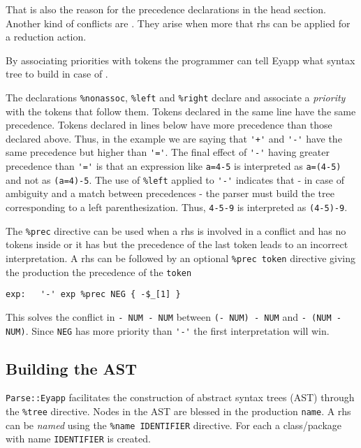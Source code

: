 That is also the reason for the precedence declarations in the 
head section. Another kind of conflicts are .
They arise when more that rhs can be applied for a reduction
action.

By associating priorities with tokens
the programmer can tell Eyapp what syntax tree
to build in case of .

The declarations 
\verb|%nonassoc|, \verb|%left| and \verb|%right| 
declare and associate a {\it priority} with the tokens
that follow them.  
Tokens declared in the same line have the same precedence. 
Tokens declared in lines below have more
precedence than those declared above. Thus, in the example
we are saying that \verb|'+'| and \verb|'-'| have the same precedence
but higher than \verb|'='|. The final effect of \verb|'-'|
having greater precedence than \verb|'='| is that an
expression like \verb|a=4-5| is interpreted as \verb|a=(4-5)| 
and not as \verb|(a=4)-5|.  The use of \verb|%left| applied to \verb|'-'|
indicates that - in case of ambiguity 
and a match between precedences - 
the parser must build the tree corresponding
to a left parenthesization. Thus, \verb|4-5-9| 
is interpreted as  \verb|(4-5)-9|.

The \verb|%prec| directive can be used when
a rhs is involved in a conflict and has no tokens
inside or it has but the precedence of the last token leads
to an incorrect interpretation. A rhs can be followed by 
an optional \verb|%prec token| directive
giving the production the precedence of the \verb|token|

\begin{verbatim}
exp:   '-' exp %prec NEG { -$_[1] }
\end{verbatim}
This solves  the conflict in \verb|- NUM - NUM|
between \verb|(- NUM) - NUM| and
{\tt - (NUM - NUM)}. Since \verb|NEG| has more
priority than \verb|'-'| the first interpretation 
will win.

\subsection{Building the AST}
\verb|Parse::Eyapp| facilitates the construction of 
abstract syntax trees (AST) through the \verb|%tree|
directive. 
Nodes in the AST are blessed in the production
\verb|name|. 
A rhs can be 
{\it named} using the \verb|%name IDENTIFIER| directive. 
For each  a 
class/package with name \verb|IDENTIFIER| is created. 

